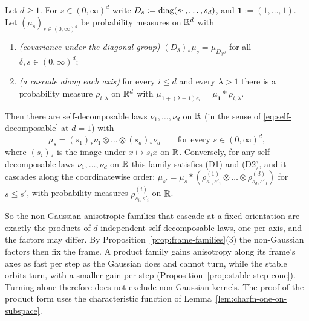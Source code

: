 \begin{proposition}\label{prop:fixed-frame-families}
Let $d \ge 1$. For $s \in (0,\infty)^d$ write $D_s := \operatorname{diag}(s_1,\dots,s_d)$, and $\mathbf 1 :=
(1,\dots,1)$. Let $(\mu_s)_{s\in(0,\infty)^d}$ be probability measures on $\mathbb{R}^d$ with
\begin{enumerate}
\item[(D1)] \emph{(covariance under the diagonal group)} $(D_\delta)_*\mu_s = \mu_{D_\delta s}$ for
all $\delta, s \in (0,\infty)^d$;
\item[(D2)] \emph{(a cascade along each axis)} for every $i \le d$ and every $\lambda > 1$ there is
a probability measure $\rho_{i,\lambda}$ on $\mathbb{R}^d$ with
$\mu_{\mathbf 1 + (\lambda - 1)e_i} = \mu_{\mathbf 1} * \rho_{i,\lambda}$.
\end{enumerate}
Then there are self-decomposable laws $\nu_1, \dots, \nu_d$ on $\mathbb{R}$
(in the sense of \ref{eq:self-decomposable} at $d = 1$) with
\[
  \mu_s = (s_1)_*\nu_1 \otimes \dots \otimes (s_d)_*\nu_d \qquad \text{for every } s \in (0,\infty)^d ,
\]
where $(s_i)_*$ is the image under $x \mapsto s_ix$ on $\mathbb{R}$. Conversely, for any self-decomposable
laws $\nu_1, \dots, \nu_d$ on $\mathbb{R}$ this family satisfies (D1) and (D2), and it cascades along
the coordinatewise order: $\mu_{s'} = \mu_s * (\rho^{(1)}_{s_1,s'_1} \otimes \dots \otimes \rho^{(d)}_{s_d,s'_d})$ for $s \le s'$,
with probability measures $\rho^{(i)}_{s_i,s'_i}$ on $\mathbb{R}$.
\end{proposition}

So the non-Gaussian anisotropic families that cascade at a fixed orientation are exactly the
products of $d$ independent self-decomposable laws, one per axis, and the factors may differ. By
Proposition~\ref{prop:frame-families}(3) the non-Gaussian factors then fix the frame. A product family
gains anisotropy along its frame's axes as fast per step as the Gaussian does and cannot turn, while
the stable orbits turn, with a smaller gain per step (Proposition~\ref{prop:stable-step-cone}). Turning alone therefore does not
exclude non-Gaussian kernels. The proof of the product form uses the characteristic function of
Lemma~\ref{lem:charfn-one-on-subspace}.

